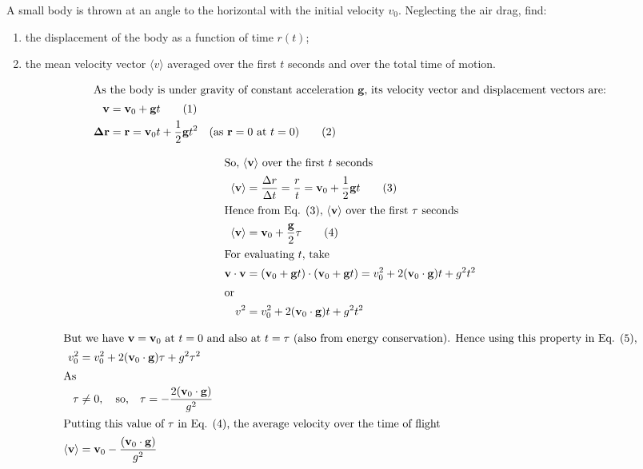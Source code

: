 
\item A small body is thrown at an angle to the horizontal with the initial velocity \( v_0 \). Neglecting the air drag, find:
    \begin{enumerate}
        \item the displacement of the body as a function of time \( r(t) \);
        \item the mean velocity vector \( \langle v \rangle \) averaged over the first \( t \) seconds and over the total time of motion.
    \end{enumerate}
\begin{solution}
    \begin{align*}
        \intertext{As the body is under gravity of constant acceleration $\mathbf{g}$, its velocity vector and displacement vectors are:}
        \mathbf{v} &= \mathbf{v}_0 + \mathbf{g}t \tag{1}\\
        \mathbf{\Delta r} &= \mathbf{r} = \mathbf{v}_0 t + \frac{1}{2} \mathbf{g} t^2 \quad (\text{as } \mathbf{r} = 0 \text{ at } t = 0) \tag{2}
    \end{align*}
    
    \begin{center}
    \end{center}
    
    \begin{align*}
        \intertext{So, $\langle \mathbf{v} \rangle$ over the first $t$ seconds}
        \langle \mathbf{v} \rangle &= \frac{\Delta r}{\Delta t} = \frac{r}{t} = \mathbf{v}_0 + \frac{1}{2} \mathbf{g} t \tag{3}\\
        \intertext{Hence from Eq. (3), $\langle \mathbf{v} \rangle$ over the first $\tau$ seconds}
        \langle \mathbf{v} \rangle &= \mathbf{v}_0 + \frac{\mathbf{g}}{2} \tau \tag{4}\\
        \intertext{For evaluating $t$, take}
        \mathbf{v} \cdot \mathbf{v} &= (\mathbf{v}_0 + \mathbf{g}t) \cdot (\mathbf{v}_0 + \mathbf{g}t) = v_0^2 + 2(\mathbf{v}_0 \cdot \mathbf{g})t + g^2 t^2\\
        \intertext{or}
        v^2 &= v_0^2 + 2(\mathbf{v}_0 \cdot \mathbf{g})t + g^2 t^2
    \end{align*}
    
    \begin{align*}
        \intertext{But we have $\mathbf{v} = \mathbf{v}_0$ at $t=0$ and also at $t = \tau$ (also from energy conservation). Hence using this property in Eq. (5),}
        v_0^2 &= v_0^2 + 2 (\mathbf{v}_0 \cdot \mathbf{g}) \tau + g^2 \tau^2\\
        \intertext{As}
        \tau &\neq 0, \quad \text{so,} \quad \tau = -\frac{2(\mathbf{v}_0 \cdot \mathbf{g})}{g^2}\\
        \intertext{Putting this value of $\tau$ in Eq. (4), the average velocity over the time of flight}
        \langle \mathbf{v} \rangle &= \mathbf{v}_0 - \frac{(\mathbf{v}_0 \cdot \mathbf{g})}{g^2}
    \end{align*}
\end{solution}